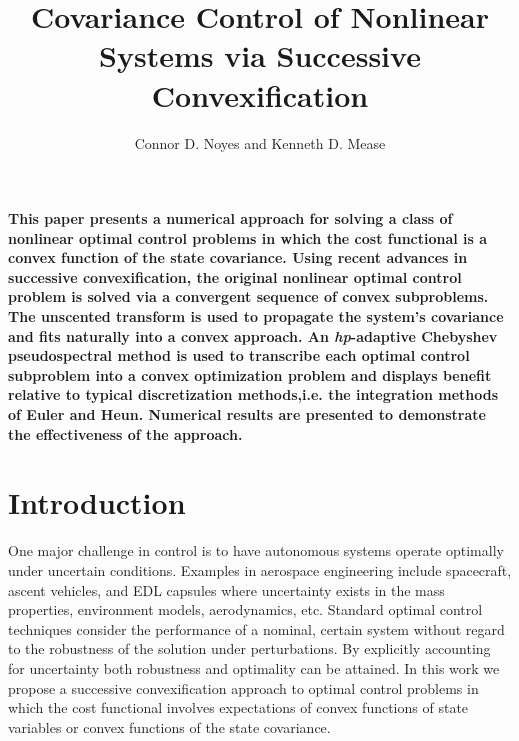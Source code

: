 \documentclass[10pt,a4paper]{article}
\author{Connor D. Noyes and Kenneth D. Mease}
\title{Covariance Control of Nonlinear Systems via Successive Convexification}
\begin{document}
	\maketitle

	\section*{}
	\textbf{This paper presents a numerical approach for solving a class of nonlinear optimal control problems in which the cost functional is a convex function of the state covariance. Using recent advances in successive convexification, the original nonlinear optimal control problem is solved via a convergent sequence of convex subproblems. The unscented transform is used to propagate the system's covariance and fits naturally into a convex approach. An \textit{hp}-adaptive Chebyshev pseudospectral method is used to transcribe each optimal control subproblem into a convex optimization problem and displays benefit relative to typical discretization methods,i.e. the integration methods of Euler and Heun. Numerical results are presented to demonstrate the effectiveness of the approach.}
	
	\section{Introduction}
	One major challenge in control is to have autonomous systems operate optimally under uncertain conditions. Examples in aerospace engineering include spacecraft, ascent vehicles, and EDL capsules where uncertainty exists in the mass properties, environment models, aerodynamics, etc. Standard optimal control techniques consider the performance of a nominal, certain system without regard to the robustness of the solution under perturbations. By explicitly accounting for uncertainty both robustness and optimality can be attained. In this work we propose a successive convexification approach to optimal control problems in which the cost functional involves expectations of convex functions of state variables or convex functions of the state covariance.
\end{document}
